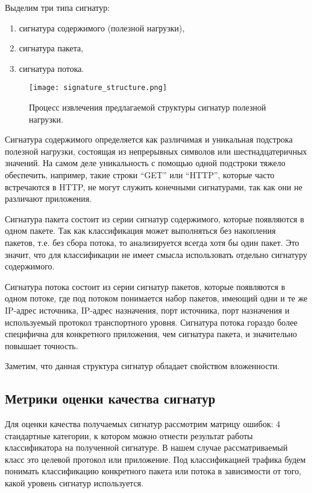 Выделим три типа сигнатур:

\begin{enumerate}
    \item сигнатура содержимого (полезной нагрузки),
    \item сигнатура пакета,
    \item сигнатура потока.
\end{enumerate}

\begin{figure}[h!]
    \begin{center}
        \texttt{[image: signature\_structure.png]}
        \caption{Процесс извлечения предлагаемой структуры сигнатур полезной нагрузки.}
    \end{center}
\end{figure}

Сигнатура содержимого определяется как различимая и уникальная подстрока полезной нагрузки, состоящая из непрерывных символов или шестнадцатеричных значений.
На самом деле уникальность с помощью одной подстроки тяжело обеспечить, например, такие строки ``GET''  или ``HTTP'', которые часто встречаются в HTTP,
не могут служить конечными сигнатурами, так как они не различают приложения.

Сигнатура пакета состоит из серии сигнатур содержимого, которые появляются в одном пакете.
Так как классификация может выполняться без накопления пакетов, т.е. без сбора потока, то анализируется всегда хотя бы один пакет.
Это значит, что для классификации не имеет смысла использовать отдельно сигнатуру содержимого.

Сигнатура потока состоит из серии сигнатур пакетов, которые появляются в одном потоке, где под потоком понимается набор пакетов, имеющий одни и те же
IP-адрес источника, IP-адрес назначения, порт источника, порт назначения и используемый протокол транспортного уровня.
Сигнатура потока гораздо более специфична для конкретного приложения, чем сигнатура пакета, и значительно повышает точность.

Заметим, что данная структура сигнатур обладает свойством вложенности.

\subsection{Метрики оценки качества сигнатур}

Для оценки качества получаемых сигнатур рассмотрим матрицу ошибок: 4 стандартные категории,
к котором можно отнести результат работы классификатора на полученной сигнатуре.
В нашем случае рассматриваемый класс это целевой протокол или приложение.
Под классификацией трафика будем понимать классификацию конкретного пакета или потока в зависимости от того, какой уровень сигнатур используется.

